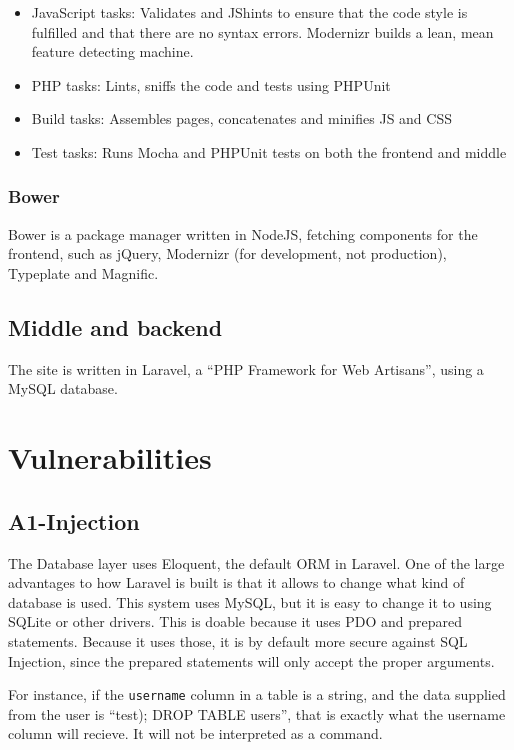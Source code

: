 \begin{itemize}
    \item JavaScript tasks: Validates and JShints to ensure that the code style is fulfilled and that there are no syntax errors. Modernizr builds a lean, mean feature detecting machine.
    \item PHP tasks: Lints, sniffs the code and tests using PHPUnit
    \item Build tasks: Assembles pages, concatenates and minifies JS and CSS
    \item Test tasks: Runs Mocha and PHPUnit tests on both the frontend and middle
\end{itemize}

\subsubsection{Bower}
\noindent
Bower is a package manager written in NodeJS, fetching components for the frontend, such as jQuery, Modernizr (for development, not production), Typeplate and Magnific.

\subsection{Middle and backend}
\noindent
The site is written in Laravel, a \enquote{PHP Framework for Web Artisans}\citep{Laravel4}, using a MySQL database.


\section{Vulnerabilities}
\subsection{A1-Injection}
\noindent
The Database layer uses Eloquent, the default ORM in Laravel. One of the large advantages to how Laravel is built is that it allows to change what kind of database is used. This system uses MySQL, but it is easy to change it to using SQLite or other drivers. This is doable because it uses PDO and prepared statements. Because it uses those, it is by default more secure against SQL Injection, since the prepared statements will only accept the proper arguments.

For instance, if the \texttt{username} column in a table is a string, and the data supplied from the user is ``test); DROP TABLE users'', that is exactly what the username column will recieve. It will not be interpreted as a command.

